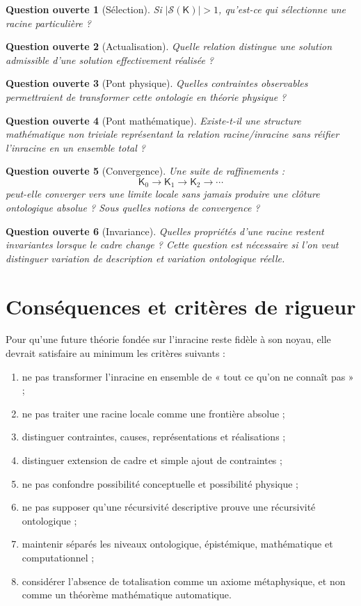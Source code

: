 \documentclass[11pt,a4paper]{article}
\newtheorem{question}{Question ouverte}[section]
\newcommand{\Cadre}{\mathsf{K}}
\newcommand{\Sol}{\mathcal{S}}
\begin{document}
\begin{question}[Sélection]
Si \(|\Sol(\Cadre)|>1\), qu'est-ce qui sélectionne une racine particulière ?
\end{question}

\begin{question}[Actualisation]
Quelle relation distingue une solution admissible d'une solution effectivement
réalisée ?
\end{question}

\begin{question}[Pont physique]
Quelles contraintes observables permettraient de transformer cette ontologie
en théorie physique ?
\end{question}

\begin{question}[Pont mathématique]
Existe-t-il une structure mathématique non triviale représentant la relation
racine/inracine sans réifier l'inracine en un ensemble total ?
\end{question}

\begin{question}[Convergence]
Une suite de raffinements :
\[
\Cadre_0\to\Cadre_1\to\Cadre_2\to\cdots
\]
peut-elle converger vers une limite locale sans jamais produire une clôture
ontologique absolue ? Sous quelles notions de convergence ?
\end{question}

\begin{question}[Invariance]
Quelles propriétés d'une racine restent invariantes lorsque le cadre change ?
Cette question est nécessaire si l'on veut distinguer variation de description
et variation ontologique réelle.
\end{question}

\section{Conséquences et critères de rigueur}

Pour qu'une future théorie fondée sur l'inracine reste fidèle à son noyau,
elle devrait satisfaire au minimum les critères suivants :
\begin{enumerate}
    \item ne pas transformer l'inracine en ensemble de « tout ce qu'on ne connaît pas » ;
    \item ne pas traiter une racine locale comme une frontière absolue ;
    \item distinguer contraintes, causes, représentations et réalisations ;
    \item distinguer extension de cadre et simple ajout de contraintes ;
    \item ne pas confondre possibilité conceptuelle et possibilité physique ;
    \item ne pas supposer qu'une récursivité descriptive prouve une récursivité ontologique ;
    \item maintenir séparés les niveaux ontologique, épistémique, mathématique et computationnel ;
    \item considérer l'absence de totalisation comme un axiome métaphysique, et non comme un théorème mathématique automatique.
\end{enumerate}
\end{document}
